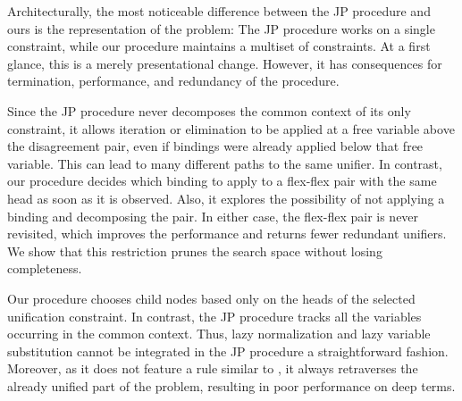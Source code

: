 Architecturally, the most noticeable difference between the JP procedure and ours is
the representation of the problem: The JP procedure works on a single constraint,
while our procedure maintains a multiset of constraints. At a first glance, this
is a merely presentational change. However, it has consequences for termination,
performance, and redundancy of the procedure.

Since the JP procedure never decomposes the common context of its only constraint, it allows
iteration or elimination to be applied at a free variable above the disagreement
pair, even if  bindings were already applied below that free variable. This can
lead to many different paths to the same unifier. In contrast, our procedure
decides which binding to apply to a flex-flex pair with the same
head as soon as it is observed. Also, it explores the possibility of not
applying a binding and decomposing the pair. In either case, the flex-flex pair
is never revisited, which improves the performance and returns fewer redundant
unifiers. We show that this restriction prunes the search space without
losing completeness.

Our procedure chooses child nodes based only on the heads of the
selected unification constraint. In contrast, the JP procedure tracks all the
variables occurring in the common context. Thus, lazy normalization and lazy
variable substitution cannot be integrated in the JP procedure a straightforward
fashion. Moreover, as it does not feature a rule similar to
, it always retraverses the already unified part of the
problem, resulting in poor performance on deep terms.


